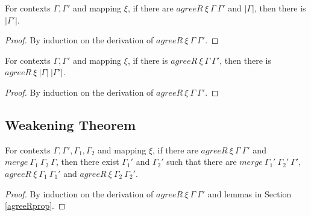 \documentclass[sigplan,screen,review,anonymous]{acmart}
\newcommand{\pure}[1]{|#1|}
\newcommand{\mrg}[3]{merge\ {#1}\ {#2}\ {#3}}
\begin{document}
\begin{lemma}\label{agreerenpure}
  For contexts $\Gamma, \Gamma'$ and mapping $\xi$, if there are $agreeR\ \xi\ \Gamma\ \Gamma'$ and $\pure{\Gamma}$, then there is $\pure{\Gamma'}$.
\end{lemma}
\begin{proof}
  By induction on the derivation of $agreeR\ \xi\ \Gamma\ \Gamma'$.
\end{proof}

\begin{lemma}\label{agreerenrere}
  For contexts $\Gamma, \Gamma'$ and mapping $\xi$, if there is $agreeR\ \xi\ \Gamma\ \Gamma'$, then there is $agreeR\ \xi\ \pure{\Gamma}\ \pure{\Gamma'}$.
\end{lemma}
\begin{proof}
  By induction on the derivation of $agreeR\ \xi\ \Gamma\ \Gamma'$.
\end{proof}

\subsection{Weakening Theorem}

\begin{lemma}\label{mergeagreereninv}
  For contexts $\Gamma, \Gamma', \Gamma_1, \Gamma_2$ and mapping $\xi$, if there are $agreeR\ \xi\ \Gamma\ \Gamma'$ and $\mrg{\Gamma_1}{\Gamma_2}{\Gamma}$, then there exist $\Gamma_1'$ and $\Gamma_2'$ such that there are $\mrg{\Gamma_1'}{\Gamma_2'}{\Gamma'}$, $agreeR\ \xi\ \Gamma_1\ \Gamma_1'$ and $agreeR\ \xi\ \Gamma_2\ \Gamma_2'$.
\end{lemma}
\begin{proof}
  By induction on the derivation of $agreeR\ \xi\ \Gamma\ \Gamma'$ and lemmas in Section \ref{agreeRprop}.
\end{proof}
\end{document}
